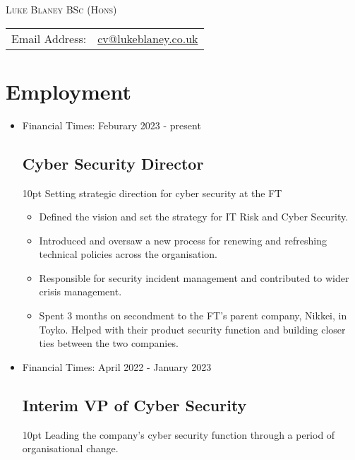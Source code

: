 \documentclass[a4paper]{article}
\newenvironment{detail}{\begin{adjustwidth}{10pt}{}}{\end{adjustwidth}}
\begin{document}
\begin{center}\textsc{\LARGE Luke Blaney BSc (Hons)}\end{center}

\begin{tabular}{ l l }

Email Address: & \href{mailto:cv@lukeblaney.co.uk}{cv@lukeblaney.co.uk}\\

\end{tabular}

\section*{Employment}

\begin{itemize}


\item Financial Times: Feburary 2023 - present
\subsection*{Cyber Security Director}
\begin{detail}
Setting strategic direction for cyber security at the FT

\begin{itemize}
	\item Defined the vision and set the strategy for IT Risk and Cyber Security.
	\item Introduced and oversaw a new process for renewing and refreshing technical policies across the organisation.
	\item Responsible for security incident management and contributed to wider crisis management.
	\item Spent 3 months on secondment to the FT's parent company, Nikkei, in Toyko.  Helped with their product security function and building closer ties between the two companies.
\end{itemize}
\end{detail}

\item Financial Times: April 2022 - January 2023
\subsection*{Interim VP of Cyber Security}
\begin{detail}
Leading the company's cyber security function through a period of organisational change.


\end{detail}
\end{itemize}
\end{document}
